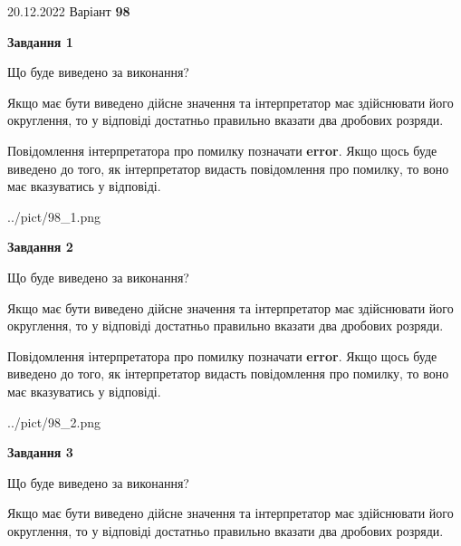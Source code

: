 \documentclass[12pt, ukrainian]{article}
\begin{document}
{20.12.2022 Варіант \No \textbf { 98 }\par}
{
\begin {Large}

{\begin {center}\textbf{Завдання 1}\end {center}}\par
Що буде виведено за виконання? \par

Якщо має бути виведено дійсне значення та інтерпретатор має здійснювати його округлення, 
то у відповіді достатньо правильно вказати два дробових розряди.

Повідомлення інтерпретатора про помилку позначати \textbf{error}.
Якщо щось буде виведено до того, як інтерпретатор видасть повідомлення про помилку, 
то воно має вказуватись у відповіді. \par

\begin{center}
	{../pict/98_1.png}
\end{center}
\newpage

{\begin {center}\textbf{Завдання 2}\end {center}}\par
Що буде виведено за виконання? \par

Якщо має бути виведено дійсне значення та інтерпретатор має здійснювати його округлення, 
то у відповіді достатньо правильно вказати два дробових розряди.

Повідомлення інтерпретатора про помилку позначати \textbf{error}.
Якщо щось буде виведено до того, як інтерпретатор видасть повідомлення про помилку, 
то воно має вказуватись у відповіді. \par

\begin{center}
	{../pict/98_2.png}
\end{center}
\newpage

{\begin {center}\textbf{Завдання 3}\end {center}}\par
Що буде виведено за виконання? \par

Якщо має бути виведено дійсне значення та інтерпретатор має здійснювати його округлення, 
то у відповіді достатньо правильно вказати два дробових розряди.


\end{Large}}
\end{document}
